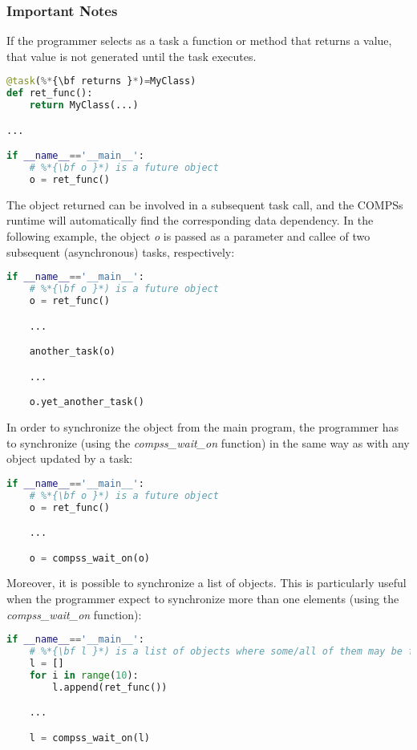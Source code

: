 \subsubsection{Important Notes}

If the programmer selects as a task a function or method that returns a value, that value is not 
generated until the task executes. 

\begin{lstlisting}[language=python]
@task(%*{\bf returns }*)=MyClass)
def ret_func():
    return MyClass(...)

...

if __name__=='__main__':
    # %*{\bf o }*) is a future object
    o = ret_func()
\end{lstlisting}

The object returned can be involved in a subsequent task call, and the COMPSs runtime will automatically 
find the corresponding data dependency. In the following example, the object \textit{o} is passed as a parameter 
and callee of two subsequent (asynchronous) tasks, respectively:

\begin{lstlisting}[language=python]
if __name__=='__main__':
    # %*{\bf o }*) is a future object
    o = ret_func()

    ...

    another_task(o)

    ...

    o.yet_another_task()
\end{lstlisting}

In order to synchronize the object from the main program, the programmer has to synchronize (using the \textit{compss\_wait\_on} function) in the same way 
as with any object updated by a task:

\begin{lstlisting}[language=python]
if __name__=='__main__':
    # %*{\bf o }*) is a future object
    o = ret_func()

    ...

    o = compss_wait_on(o)
\end{lstlisting}
                         
Moreover, it is possible to synchronize a list of objects. This is particularly useful when the programmer expect to synchronize more 
than one elements (using the \textit{compss\_wait\_on} function):

\begin{lstlisting}[language=python]
if __name__=='__main__':
    # %*{\bf l }*) is a list of objects where some/all of them may be future objects
    l = []
    for i in range(10):
        l.append(ret_func())

    ...

    l = compss_wait_on(l)
\end{lstlisting}
                         
